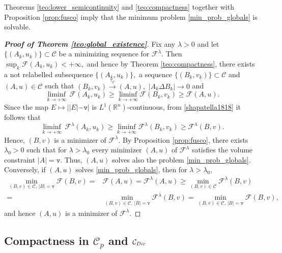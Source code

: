 \documentclass[reqno]{amsart}
\numberwithin{equation}{section}
\theoremstyle{plain}
\theoremstyle{definition}
\newcommand{\R}{\mathbb{R}}
\newcommand{\fm}{\mathtt{v}}
\newcommand{\cF}{\mathcal{F}}
\newcommand{\admissible}{\mathcal{C}}
\begin{document}
 Theorems \ref{teo:lower_semicontinuity} and \ref{teo:compactness} together with Proposition \ref{prop:fusco} imply that the minimum problem \eqref{min_prob_globals} is solvable.

\begin{proof}[\textbf{Proof of Theorem \ref{teo:global_existence}}]
%
Fix any $\lambda>0$ and let $\{(A_k,u_k)\}\subset\admissible$ be a minimizing sequence for $\cF^\lambda.$ Then $\sup_k \cF(A_k,u_k)<+\infty,$ and hence  by Theorem \ref{teo:compactness}, there exists a not relabelled subsequence $\{(A_k,u_k)\},$ a sequence $\{(B_k,v_k)\}\subset\admissible$ and $(A,u)\in\admissible$ such that $(B_k,v_k)\overset{\tau_\admissible}{\to} (A,u),$ $|A_k\Delta B_k|\to0$ and
\begin{equation}\label{shapatella1818}
\liminf\limits_{k\to+\infty}\,\cF(A_k,u_k) \ge \liminf\limits_{k\to+\infty}\cF(B_k,v_k) \ge \cF(A,u). 
\end{equation}
%
Since the map $E\mapsto ||E| - \fm|$ is $L^1(\R^n)$-continuous, from \eqref{shapatella1818} it follows that 
$$
\liminf\limits_{k\to+\infty}\,\cF^\lambda(A_k,u_k) \ge \liminf\limits_{k\to+\infty} \cF^\lambda(B_k,v_k) \ge \cF^\lambda(B,v). 
$$
Hence, $(B,v)$ is a minimizer of $\cF^\lambda.$
By Proposition \ref{prop:fusco}, there exists $\lambda_0>0$ such that for $\lambda>\lambda_0$ every minimizer $(A,u)$ of $\cF^\lambda$ satisfies the  volume constraint $|A|=\fm.$ Thus,
$(A,u)$ solves also the problem \eqref{min_prob_globals}.
Conversely, if $(A,u)$ solves \eqref{min_prob_globals}, then for $\lambda>\lambda_0,$
$$
\begin{aligned}
\min_{(B,v)\in\admissible,\,|B|=\fm}\cF(B,v) = & \cF(A,u) = \cF^\lambda(A,u) \ge 
\min_{(B,v)\in\admissible}\cF^\lambda(B,v)\\
= & \min_{(B,v)\in\admissible,\,|B|=\fm}\cF^\lambda(B,v) =\min_{(B,v)\in\admissible,\,|B|=\fm}\cF(B,v),
\end{aligned}
$$
and hence  $(A,u)$ is a minimizer of $\cF^\lambda.$
%
\end{proof}


\subsection{Compactness in $\admissible_p$ and $\admissible_{\rm Dir}$}\label{subsec:extension_CLS}
\end{document}
